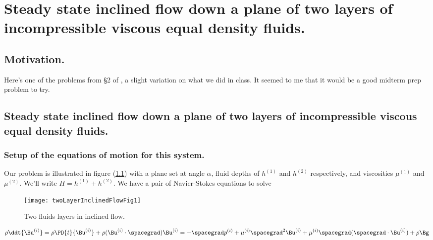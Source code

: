 
%


\chapter{Steady state inclined flow down a plane of two layers of incompressible viscous equal density fluids.}
\label{chap:twoLayerInclinedFlow}
{}
\date{Mar 1, 2012}

\beginArtWithToc

\section{Motivation.}

Here's one of the problems from \S 2 of \cite{acheson1990elementary}, a slight variation on what we did in class.  It seemed to me that it would be a good midterm prep problem to try.

\section{Steady state inclined flow down a plane of two layers of incompressible viscous equal density fluids.}

\subsection{Setup of the equations of motion for this system.}

Our problem is illustrated in figure (\ref{fig:twoLayerInclinedFlow:twoLayerInclinedFlowFig1}) with a plane set at angle $\alpha$, fluid depths of $h^{(1)}$ and $h^{(2)}$ respectively, and viscosities $\mu^{(1)}$ and $\mu^{(2)}$.  We'll write $H = h^{(1)} + h^{(2)}$.  We have a pair of Navier-Stokes equations to solve

\begin{figure}[htp]
   \centering
   \texttt{[image: twoLayerInclinedFlowFig1]}
   \caption{Two fluids layers in inclined flow.}\label{fig:twoLayerInclinedFlow:twoLayerInclinedFlowFig1}
\end{figure}

\begin{equation}\label{eqn:twoLayerInclinedFlow:10}
\rho \ddt{\Bu^{(i)}} = \rho \PD{t}{\Bu^{(i)}} + \rho (\Bu^{(i)} \cdot \spacegrad) \Bu^{(i)} = - \spacegrad p^{(i)} + \mu^{(i)} \spacegrad^2 \Bu^{(i)} + \mu^{(i)} \spacegrad (\spacegrad \cdot \Bu^{(i)}) + \rho \Bg
\end{equation}

